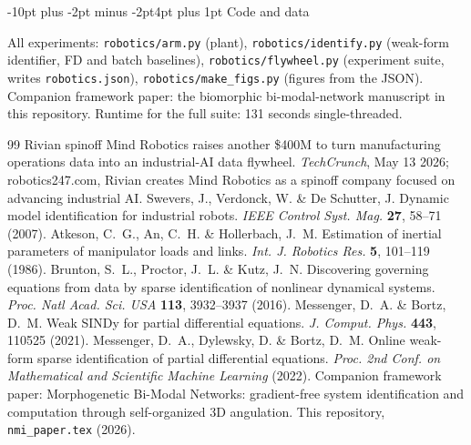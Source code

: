 \documentclass[10pt]{article}
\makeatletter
\renewcommand\subsection{\@startsection{subsection}{2}{\z@}%
  {-10pt plus -2pt minus -2pt}{4pt plus 1pt}%
  {\normalfont\bfseries\normalsize}}
\makeatother
\begin{document}
\subsection{Code and data}

All experiments: \texttt{robotics/arm.py} (plant),
\texttt{robotics/identify.py} (weak-form identifier, FD and batch baselines),
\texttt{robotics/flywheel.py} (experiment suite, writes
\texttt{robotics.json}), \texttt{robotics/make\_figs.py} (figures from the
JSON). Companion framework paper\cite{Companion26}: the biomorphic
bi-modal-network manuscript in this repository. Runtime for the full suite:
131 seconds single-threaded.

\begin{thebibliography}{99}
 Rivian spinoff Mind Robotics raises another \$400M to turn
manufacturing operations data into an industrial-AI data flywheel.
\emph{TechCrunch}, May 13 2026; robotics247.com, Rivian creates Mind Robotics
as a spinoff company focused on advancing industrial AI.
 Swevers, J., Verdonck, W. \& De Schutter, J. Dynamic model
identification for industrial robots. \emph{IEEE Control Syst. Mag.}
\textbf{27}, 58--71 (2007).
 Atkeson, C.~G., An, C.~H. \& Hollerbach, J.~M.
Estimation of inertial parameters of manipulator loads and links.
\emph{Int. J. Robotics Res.} \textbf{5}, 101--119 (1986).
 Brunton, S.~L., Proctor, J.~L. \& Kutz, J.~N. Discovering
governing equations from data by sparse identification of nonlinear dynamical
systems. \emph{Proc. Natl Acad. Sci. USA} \textbf{113}, 3932--3937 (2016).
 Messenger, D.~A. \& Bortz, D.~M. Weak SINDy for partial
differential equations. \emph{J. Comput. Phys.} \textbf{443}, 110525 (2021).
 Messenger, D.~A., Dylewsky, D. \& Bortz, D.~M. Online
weak-form sparse identification of partial differential equations.
\emph{Proc. 2nd Conf. on Mathematical and Scientific Machine Learning} (2022).
 Companion framework paper: Morphogenetic Bi-Modal
Networks: gradient-free system identification and computation through
self-organized 3D angulation. This repository, \texttt{nmi\_paper.tex} (2026).
\end{thebibliography}
\end{document}
